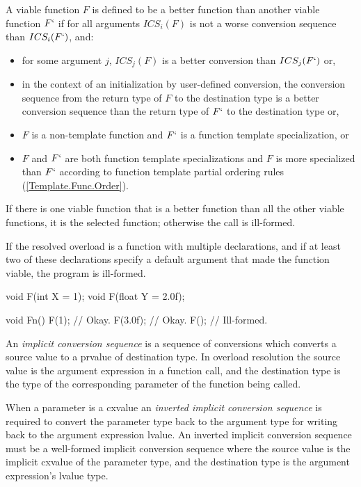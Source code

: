 \p A viable function \(F\) is defined to be a better function than another
viable function \(F`\) if for all arguments \(ICS_i(F)\) is not a worse
conversion sequence than \(ICS_i(F`)\), and:
\begin{itemize}
  \item for some argument \(j\), \(ICS_j(F)\) is a better conversion than
  \(ICS_j(F`)\) or,
  \item in the context of an initialization by user-defined conversion, the
  conversion sequence from the return type of \(F\) to the destination type is a
  better conversion sequence than the return type of \(F`\) to the destination
  type or,
  \item \(F\) is a non-template function and \(F`\) is a function template
  specialization, or
  \item \(F\) and \(F`\) are both function template specializations and \(F\) is
  more specialized than \(F`\) according to function template partial ordering
  rules (\ref{Template.Func.Order}).
\end{itemize}

\p If there is one viable function that is a better function than all the other
viable functions, it is the selected function; otherwise the call is ill-formed.

\p If the resolved overload is a function with multiple declarations, and if at
least two of these declarations specify a default argument that made the
function viable, the program is ill-formed.

\begin{HLSL}
void F(int X = 1);
void F(float Y = 2.0f);

void Fn() {
  F(1);     // Okay.
  F(3.0f);  // Okay.
  F();      // Ill-formed.
}
\end{HLSL}


\p An \textit{implicit conversion sequence} is a sequence of conversions which
converts a source value to a prvalue of destination type. In overload resolution
the source value is the argument expression in a function call, and the
destination type is the type of the corresponding parameter of the function
being called.

\p When a parameter is a cxvalue an \textit{inverted implicit conversion
sequence} is required to convert the parameter type back to the argument type
for writing back to the argument expression lvalue. An inverted implicit
conversion sequence must be a well-formed implicit conversion sequence where the
source value is the implicit cxvalue of the parameter type, and the destination
type is the argument expression's lvalue type.


